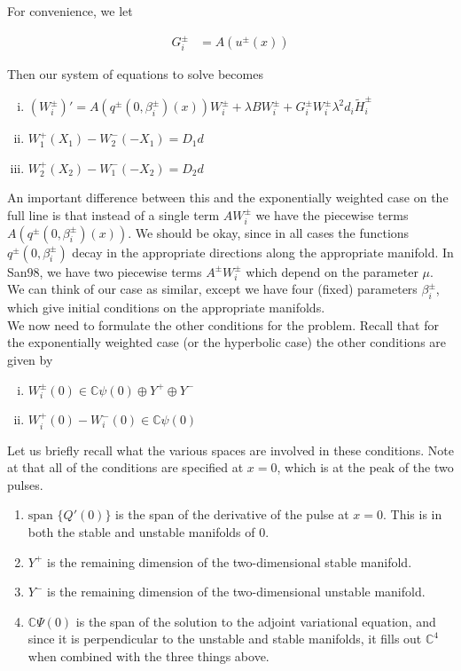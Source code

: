 \documentclass[12pt]{article}
\def\C{{\mathbb C}}
\begin{document}
For convenience, we let

\begin{align*}
G_i^\pm &= A(u^\pm(x))
\end{align*}

Then our system of equations to solve becomes

\begin{enumerate}[(i)]
\item $(W_i^\pm)' = A(q^\pm(0, \beta_i^\pm)(x)) W_i^\pm + \lambda B W_i^\pm + G_i^\pm W_i^\pm \lambda^2 d_i \tilde{H}_i^\pm$
\item $W_1^+(X_1) - W_2^-(-X_1) = D_1 d$
\item $W_2^+(X_2) - W_1^-(-X_2) = D_2 d$
\end{enumerate}

An important difference between this and the exponentially weighted case on the full line is that instead of a single term $A W_i^\pm$ we have the piecewise terms $A(q^\pm(0, \beta_i^\pm)(x)) $. We should be okay, since in all cases the functions $q^\pm(0, \beta_i^\pm)$ decay in the appropriate directions along the appropriate manifold. In San98, we have two piecewise terms $A^\pm W_i^\pm$ which depend on the parameter $\mu$. We can think of our case as similar, except we have four (fixed) parameters $\beta_i^\pm$, which give initial conditions on the appropriate manifolds.\\

We now need to formulate the other conditions for the problem. Recall that for the exponentially weighted case (or the hyperbolic case) the other conditions are given by

\begin{enumerate}[(i)]
\item $W_i^\pm(0) \in \C \psi(0) \oplus Y^+ \oplus Y^-$
\item $W_i^+(0) - W_i^-(0) \in \C \psi(0)$
\end{enumerate}

Let us briefly recall what the various spaces are involved in these conditions. Note at that all of the conditions are specified at $x = 0$, which is at the peak of the two pulses.

\begin{enumerate}
	\item $\text{span }\{Q'(0)\}$ is the span of the derivative of the pulse at $x = 0$. This is in both the stable and unstable manifolds of 0.
	\item $Y^+$ is the remaining dimension of the two-dimensional stable manifold.
	\item $Y^-$ is the remaining dimension of the two-dimensional unstable manifold.
	\item $\C \Psi(0)$ is the span of the solution to the adjoint variational equation, and since it is perpendicular to the unstable and stable manifolds, it fills out $\C^4$ when combined with the three things above.
\end{enumerate}
\end{document}
